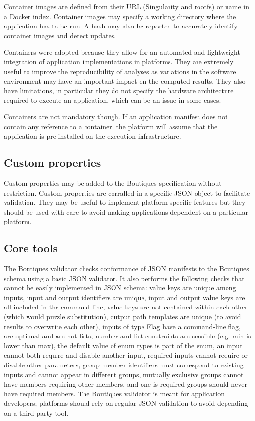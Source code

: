 \documentclass{article}
\newcommand{\note}[2]{\pdfmargincomment[color=yellow,author=#1,open=true]{#2}}
\begin{document}
Container images are defined from their URL (Singularity and rootfs)
or name in a Docker index. Container images may specify a working
directory where the application has to be run. A hash may also be
reported to accurately identify container images and detect updates.

Containers were adopted because they allow for an automated and
lightweight integration of application implementations in
platforms. They are extremely useful to improve the reproducibility of
analyses as variations in the software environment may have an
important impact on the computed results. They also have limitations,
in particular they do not specify the hardware architecture required
to execute an application, which can be an issue in some cases.

Containers are not mandatory though. If an application manifest does
not contain any reference to a container, the platform will assume
that the application is pre-installed on the execution infrastructure. 

\subsection{Custom properties}

Custom properties may be added to the Boutiques specification without
restriction. Custom properties are corralled in a specific JSON object
to facilitate validation. They may be useful to implement
platform-specific features but they should be used with care to avoid
making applications dependent on a particular platform.

\subsection{Core tools} 

The Boutiques validator checks conformance of JSON manifests to the
Boutiques schema using a basic JSON validator. It also performs the
following checks that cannot be easily implemented in JSON schema:
value keys are unique among inputs, input and output identifiers are
unique, input and output value keys are all included in the command
line, value keys are not contained within each other (which would
puzzle substitution), output path templates are unique (to avoid
results to overwrite each other), inputs of type Flag have a
command-line flag, are optional and are not lists, number and list
constraints are sensible (e.g. min is lower than max), the default
value of enum types is part of the enum, an input cannot both require
\note{greg}{should Enum be capitalized? It is earlier in the document}
and disable another input, required inputs cannot require or disable
other parameters, group member identifiers must correspond to existing
inputs and cannot appear in different groups, mutually exclusive
groups cannot have members requiring other members, and
one-is-required groups should never have required members. The
Boutiques validator is meant for application developers; platforms
should rely on regular JSON validation to avoid depending on a
third-party tool.
\end{document}
